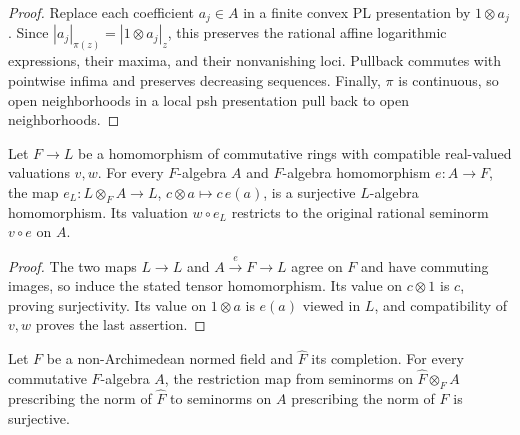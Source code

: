 \begin{proof}
Replace each coefficient $a_j\in A$ in a finite convex PL presentation by $1\otimes a_j$.
Since $|a_j|_{\pi(z)}=|1\otimes a_j|_z$, this preserves the rational affine logarithmic expressions,
their maxima, and their nonvanishing loci. Pullback commutes with pointwise infima and preserves decreasing
sequences. Finally, $\pi$ is continuous, so open neighborhoods in a local psh presentation pull back to open
neighborhoods.
\end{proof}

\begin{lemma}\label{lem:fc-rational-scalar-lift}
\leanok
{}
Let $F\to L$ be a homomorphism of commutative rings with compatible real-valued valuations $v,w$.
For every $F$-algebra $A$ and $F$-algebra homomorphism $e\colon A\to F$, the map
$e_L\colon L\otimes_FA\to L$, $c\otimes a\mapsto c\,e(a)$, is a surjective $L$-algebra homomorphism.
Its valuation $w\circ e_L$ restricts to the original rational seminorm $v\circ e$ on $A$.
\end{lemma}

\begin{proof}
The two maps $L\to L$ and $A\xrightarrow{e}F\to L$ agree on $F$ and have commuting images,
so induce the stated tensor homomorphism. Its value on $c\otimes1$ is $c$, proving surjectivity.
Its value on $1\otimes a$ is $e(a)$ viewed in $L$, and compatibility of $v,w$ proves the last assertion.
\end{proof}

\begin{lemma}\label{lem:fc-completion-lift}
\leanok
{}
Let $F$ be a non-Archimedean normed field and $\widehat F$ its completion. For every commutative $F$-algebra $A$,
the restriction map from seminorms on $\widehat F\otimes_FA$ prescribing the norm of $\widehat F$ to seminorms on
$A$ prescribing the norm of $F$ is surjective.
\end{lemma}

